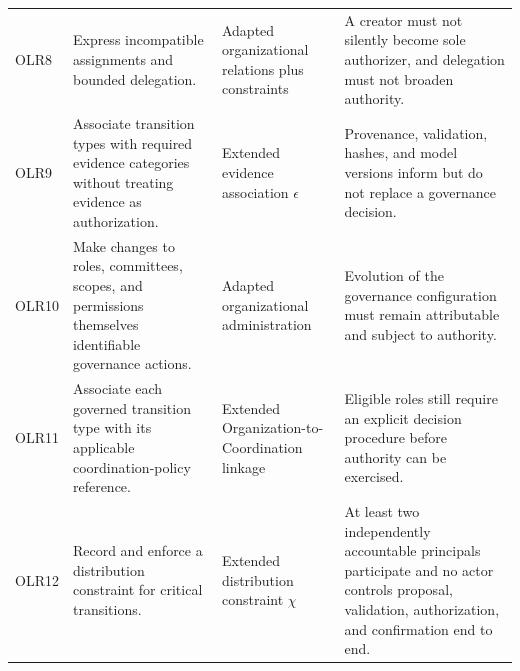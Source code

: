 \documentclass[journal]{IEEEtran}
\begin{document}
\begin{table}[t]
\begin{tabular}{p{1.0cm}p{5.1cm}p{4.1cm}p{5.2cm}}
OLR8 &
Express incompatible assignments and bounded delegation. &
Adapted organizational relations plus constraints &
A creator must not silently become sole authorizer, and delegation
must not broaden authority.\\

OLR9 &
Associate transition types with required evidence categories
without treating evidence as authorization. &
Extended evidence association $\epsilon$ &
Provenance, validation, hashes, and model versions inform but
do not replace a governance decision.\\

OLR10 &
Make changes to roles, committees, scopes, and permissions
themselves identifiable governance actions. &
Adapted organizational administration &
Evolution of the governance configuration must remain attributable
and subject to authority.\\

OLR11 &
Associate each governed transition type with its applicable
coordination-policy reference. &
Extended Organization-to-Coordination linkage &
Eligible roles still require an explicit decision procedure
before authority can be exercised.\\

OLR12 &
Record and enforce a distribution constraint for critical
transitions. &
Extended distribution constraint $\chi$ &
At least two independently accountable principals participate
and no actor controls proposal, validation, authorization,
and confirmation end to end.\\

\hline
\end{tabular}
\end{table}



\end{document}
